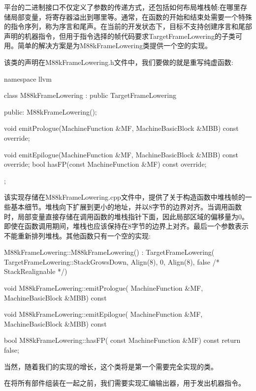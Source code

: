 平台的二进制接口不仅定义了参数的传递方式，还包括如何布局堆栈帧:在哪里存储局部变量，将寄存器溢出到哪里等。通常，在函数的开始和结束处需要一个特殊的指令序列，称为序言和尾声。在当前的开发状态下，目标不支持创建序言和尾部声明的机器指令，但用于指令选择的帧代码要求TargetFrameLowering的子类可用。简单的解决方案是为M88kFrameLowering类提供一个空的实现。

该类的声明在M88kFrameLowering.h文件中，我们要做的就是重写纯虚函数:

\begin{cpp}
namespace llvm {
class M88kFrameLowering : public TargetFrameLowering {
public:
    M88kFrameLowering();

    void
    emitPrologue(MachineFunction &MF,
    MachineBasicBlock &MBB) const override;

    void
    emitEpilogue(MachineFunction &MF,
                 MachineBasicBlock &MBB) const override;
    bool hasFP(const MachineFunction &MF) const override;
};
}
\end{cpp}

该实现存储在M88kFrameLowering.cpp文件中，提供了关于构造函数中堆栈帧的一些基本细节。堆栈向下扩展到更小的地址，并以8字节的边界对齐。当调用函数时，局部变量直接存储在调用函数的堆栈指针下面，因此局部区域的偏移量为0。即使在函数调用期间，堆栈也应该保持在8字节的边界上对齐。最后一个参数表示不能重新排列堆栈。其他函数只有一个空的实现:

\begin{cpp}
M88kFrameLowering::M88kFrameLowering()
    : TargetFrameLowering(
        TargetFrameLowering::StackGrowsDown, Align(8),
        0, Align(8), false /* StackRealignable */) {}

void M88kFrameLowering::emitPrologue(
    MachineFunction &MF, MachineBasicBlock &MBB) const {}

void M88kFrameLowering::emitEpilogue(
    MachineFunction &MF, MachineBasicBlock &MBB) const {}

bool M88kFrameLowering::hasFP(
    const MachineFunction &MF) const { return false; }
\end{cpp}

当然，随着我们的实现的增长，这个类将是第一个需要完全实现的类。

在将所有部件组装在一起之前，我们需要实现汇编输出器，用于发出机器指令。

















































